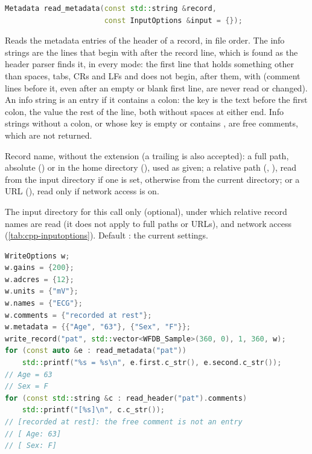 \begin{lstlisting}[language=C++,style=signature]
Metadata read_metadata(const std::string &record,
                       const InputOptions &input = {});
\end{lstlisting}
Reads the metadata entries of the header of a record, in file order. The info strings are
the lines that begin with \code{\#} after the record line, which is found as the header
parser finds it, in every mode: the first line that holds something other than spaces,
tabs, CRs and LFs and does not begin, after them, with \code{\#} (comment lines before
it, even after an empty or blank first line, are never read or changed). An info string is
an entry if it contains a colon: the key is the text before the first colon, the value the
rest of the line, both without spaces at either end. Info strings without a colon, or
whose key is empty or contains \code{\#}, are free comments, which are not returned.
\begin{params}
\item[record] Record name, without the  extension (a trailing  is
  also accepted): a full path, absolute () or in the home
  directory (), used as given; a relative path
  (, ), read from the input directory if one is set,
  otherwise from the current directory; or a URL
  (), read only if network access is
  on.
\item[input] The input directory for this call only (optional), under which relative
  record names are read (it does not apply to full paths or URLs), and network access
  (\cref{tab:cpp-inputoptions}). Default \code{\{\}}: the current settings.
\end{params}
\begin{lstlisting}[language=C++,style=example]
WriteOptions w;
w.gains = {200};
w.adcres = {12};
w.units = {"mV"};
w.names = {"ECG"};
w.comments = {"recorded at rest"};
w.metadata = {{"Age", "63"}, {"Sex", "F"}};
write_record("pat", std::vector<WFDB_Sample>(360, 0), 1, 360, w);
for (const auto &e : read_metadata("pat"))
    std::printf("%s = %s\n", e.first.c_str(), e.second.c_str());
// Age = 63
// Sex = F
for (const std::string &c : read_header("pat").comments)
    std::printf("[%s]\n", c.c_str());
// [recorded at rest]: the free comment is not an entry
// [ Age: 63]
// [ Sex: F]
\end{lstlisting}

